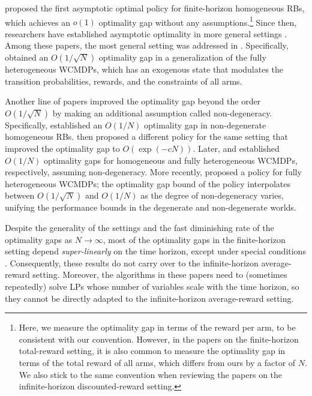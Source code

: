 \citet{HuFra_17_rb_asymptotic} proposed the first asymptotic optimal policy for finite-horizon homogeneous RBs, which achieves an $o(1)$ optimality gap without any assumptions.\footnote{Here, we measure the optimality gap in terms of the reward per arm, to be consistent with our convention. However, in the papers on the finite-horizon total-reward setting, it is also common to measure the optimality gap in terms of the total reward of all arms, which differs from ours by a factor of $N$. We also stick to the same convention when reviewing the papers on the infinite-horizon discounted-reward setting.} 
Since then, researchers have established asymptotic optimality in more general settings \citep{ZayJasWan_19_rb,DaeChoGri_23,GhoNagJaiTam_23_finite_discount,BroSmi_19_rb,BroZha_22}. 
Among these papers, the most general setting was addressed in \citep{BroZha_22}. Specifically, \citet{BroZha_22} obtained an $O(1/\sqrt{N})$ optimality gap in a generalization of the fully heterogeneous WCMDPs, which has an exogenous state that modulates the transition probabilities, rewards, and the constraints of all arms. 


Another line of papers improved the optimality gap beyond the order $O(1/\sqrt{N})$ by making an additional assumption called non-degeneracy. Specifically, \citet{ZhaFra_21} established an $O(1/N)$ optimality gap in non-degenerate homogeneous RBs. \citet{GasGauYan_23_exponential} then proposed a different policy for the same setting that improved the optimality gap to $O(\exp(-cN))$. Later, \citet{GasGauYan_24_reopt} and \citet{BroZha_23} established $O(1/N)$ optimality gaps for homogeneous and fully heterogeneous WCMDPs, respectively, assuming non-degeneracy. More recently, \citet{Zhang24_het} proposed a policy for fully heterogeneous WCMDPs; the optimality gap bound of the policy interpolates between $O(1/\sqrt{N})$ and $O(1/N)$ as the degree of non-degeneracy varies, unifying the performance bounds in the degenerate and non-degenerate worlds. 


Despite the generality of the settings and the fast diminishing rate of the optimality gaps as $N\to\infty$, most of the optimality gaps in the finite-horizon setting depend \emph{super-linearly} on the time horizon, except under special conditions \citep{BroZha_23,GasGauYan_24_reopt}. Consequently, these results do not carry over to the infinite-horizon average-reward setting. Moreover, the algorithms in these papers need to (sometimes repeatedly) solve LPs whose number of variables scale with the time horizon, so they cannot be directly adapted to the infinite-horizon average-reward setting. 


